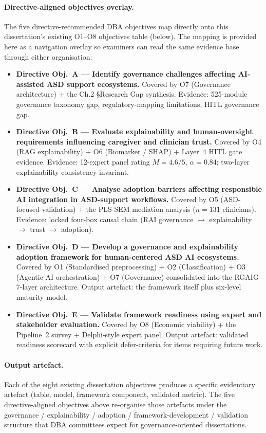 \paragraph{Directive-aligned objectives overlay.}
\label{para:objectives_lens}
The five directive-recommended DBA objectives map directly onto this dissertation's existing O1--O8 objectives table (below). The mapping is provided here as a navigation overlay so examiners can read the same evidence base through either organisation:

\begin{itemize}[leftmargin=*, itemsep=3pt]
    \item \textbf{Directive Obj.~A — Identify governance challenges affecting AI-assisted ASD support ecosystems.} Covered by O7 (Governance architecture) + the Ch.2 §Research Gap synthesis. Evidence: 525-module governance taxonomy gap, regulatory-mapping limitations, HITL governance gap.
    \item \textbf{Directive Obj.~B — Evaluate explainability and human-oversight requirements influencing caregiver and clinician trust.} Covered by O4 (RAG explainability) + O6 (Biomarker / SHAP) + Layer~4 HITL gate evidence. Evidence: 12-expert panel rating $M = 4.6/5$, $\alpha = 0.84$; two-layer explainability consistency invariant.
    \item \textbf{Directive Obj.~C — Analyse adoption barriers affecting responsible AI integration in ASD-support workflows.} Covered by O5 (ASD-focused validation) + the PLS-SEM mediation analysis ($n = 131$ clinicians). Evidence: locked four-box causal chain (RAI governance $\to$ explainability $\to$ trust $\to$ adoption).
    \item \textbf{Directive Obj.~D — Develop a governance and explainability adoption framework for human-centered ASD AI ecosystems.} Covered by O1 (Standardised preprocessing) + O2 (Classification) + O3 (Agentic AI orchestration) + O7 (Governance) consolidated into the RGAIG 7-layer architecture. Output artefact: the framework itself plus six-level maturity model.
    \item \textbf{Directive Obj.~E — Validate framework readiness using expert and stakeholder evaluation.} Covered by O8 (Economic viability) + the Pipeline~2 survey + Delphi-style expert panel. Output artefact: validated readiness scorecard with explicit defer-criteria for items requiring future work.
\end{itemize}

\paragraph{Output artefact.} Each of the eight existing dissertation objectives produces a specific evidentiary artefact (table, model, framework component, validated metric). The five directive-aligned objectives above re-organise those artefacts under the governance / explainability / adoption / framework-development / validation structure that DBA committees expect for governance-oriented dissertations.

